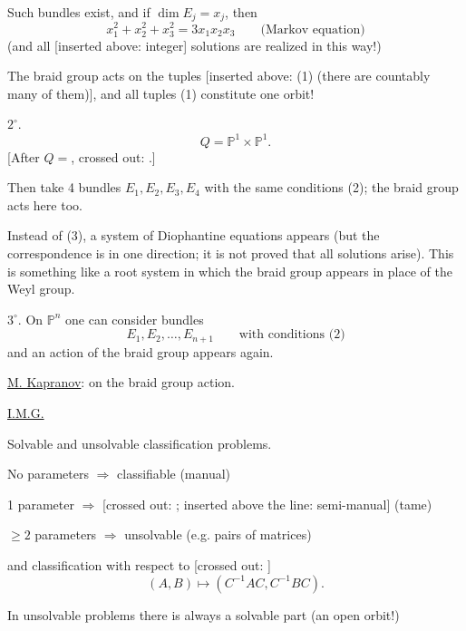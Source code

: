 Such bundles exist, and if $\dim E_j=x_j$, then
\begin{equation*}
x_1^2+x_2^2+x_3^2=3x_1x_2x_3
\qquad\text{(Markov equation)} \tag{3}
\end{equation*}
(and all [inserted above: integer] solutions are realized in this way!)

The braid group acts on the tuples [inserted above: (1) (there are countably many of them)],
and all tuples (1) constitute one orbit!

$2^{\circ}$.
\begin{equation*}
Q=\mathbb{P}^{1}\times\mathbb{P}^{1}.
\end{equation*}
[After $Q=$, crossed out:
.]

Then take 4 bundles $E_1,E_2,E_3,E_4$
with the same conditions (2); the braid group acts here too.

Instead of (3), a system of Diophantine equations appears
(but the correspondence is in one direction; it is not proved that all solutions arise).
This is something like a root system in which the braid group appears
in place of the Weyl group.

$3^{\circ}$. On $\mathbb{P}^{n}$ one can consider bundles
\begin{equation*}
E_1,E_2,\ldots,E_{n+1}\qquad\text{with conditions (2)}
\end{equation*}
and an action of the braid group appears again.

\underline{M. Kapranov}: on the braid group action.

\underline{I.M.G.}

Solvable and unsolvable classification problems.

No parameters $\Rightarrow$ classifiable (manual)

1 parameter $\Rightarrow$
[crossed out: ;
inserted above the line: semi-manual] (tame)

$\geq 2$ parameters $\Rightarrow$ unsolvable
(e.g. pairs of matrices)

and classification with respect to
[crossed out: ]
\begin{equation*}
(A,B)\mapsto(C^{-1}AC,C^{-1}BC).
\end{equation*}

In unsolvable problems there is always a solvable part
(an open orbit!)

